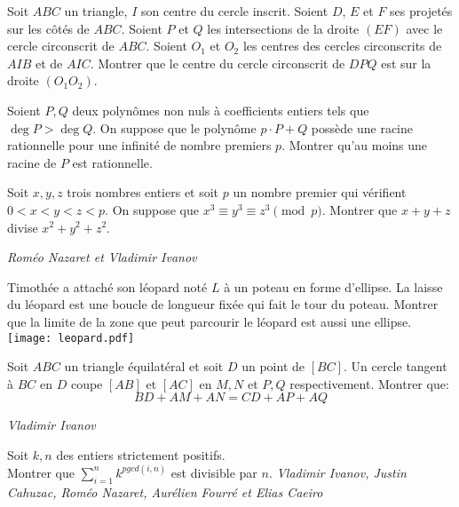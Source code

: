 \begin{exo}{}
Soit $ABC$ un triangle, $I$ son centre du cercle inscrit. Soient $D$, $E$ et $F$ ses projetés sur les côtés de $ABC$. Soient $P$ et $Q$ les intersections de la droite $(EF)$ avec le cercle circonscrit de $ABC$. Soient $O_1$ et $O_2$ les centres des cercles circonscrits de $AIB$ et de $AIC$. Montrer que le centre du cercle circonscrit de $DPQ$ est sur la droite $(O_1O_2)$.
\end{exo}

\begin{exo}{}
Soient $P,Q$ deux polynômes non nuls à coefficients entiers tels que $ \deg P>\deg Q$. On suppose que le polynôme $p \cdot P+Q$ possède une racine rationnelle pour une infinité de nombre premiers $p$. Montrer qu'au moins une racine de $P$ est rationnelle.
\end{exo}



\begin{exo}{}
Soit $x,y,z$ trois nombres entiers et soit $p$ un nombre premier qui vérifient $0<x<y<z<p$. On suppose que $x^3\equiv y^3\equiv z^3\pmod p$. Montrer que $x+y+z$ divise $x^2+y^2+z^2$.

\medskip
\textit{Roméo Nazaret et Vladimir Ivanov}
\end{exo}


\begin{exo}{}
 Timothée a attaché son léopard noté $L$ à un poteau en forme d'ellipse. La laisse du léopard est une boucle de longueur fixée qui fait le tour du poteau. Montrer que la limite de la zone que peut parcourir le léopard est aussi une ellipse. \\
\texttt{[image: leopard.pdf]}\end{exo}





\begin{exo}{}
Soit  $ABC$ un triangle équilatéral et soit $D$ un point de $[BC]$. Un cercle tangent à $BC$ en $D$ coupe $[AB]$ et $[AC]$ en $M,N$ et $P,Q$ respectivement. Montrer que:
$$BD+AM+AN=CD+AP+AQ$$

\medskip
\textit{Vladimir Ivanov}
\end{exo}

\begin{exo}{}
Soit $k, n$ des entiers strictement positifs. \\
Montrer que $\sum\limits_{i=1}^n k^{pgcd(i,n)}$ est divisible par $n$.
\medskip
\textit{Vladimir Ivanov, Justin Cahuzac, Roméo Nazaret, Aurélien Fourré et Elias Caeiro}
\end{exo}



